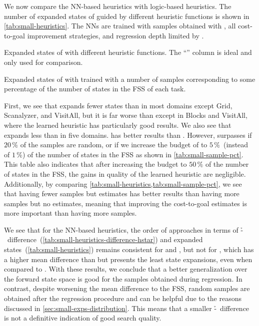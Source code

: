 We now compare the NN-based heuristics with logic-based heuristics. The number of expanded states of \gbfs guided by different heuristic functions is shown in \cref{tab:small-heuristics}. The NNs are trained with samples obtained with \bfsrw, all cost-to-goal improvement strategies, and regression depth limited by \rlmeanfx.  

\begin{table}[tb]
    \caption[Expanded states of different heuristic functions.]{Expanded states of \gbfs with different heuristic functions. The ``\hstar'' column is ideal and only used for comparison.}
    \addmargin
    \label{tab:small-heuristics}
    \centering
    
\end{table}

\begin{table}[tb]
    \caption[Expanded states from different sample set sizes.]{Expanded states of \gbfs with \hnnl{\rlmeanfx} trained with a number of samples corresponding to some percentage of the number of states in the FSS of each task.}
    \label{tab:small-sample-pct}
    \addmargin
    \centering
    
\end{table}

First, we see that \hnnbase expands fewer states than \hgc in most domains except Grid, Scanalyzer, and VisitAll, but it is far worse than \hff except in Blocks and VisitAll, where the learned heuristic has particularly good results. We also see that \hnnl{\rlmeanfx} expands less than \hnnbase in five domains. \hff has better results than \hnnl{\rlmeanfx}. However, \hnnl{\rlmeanfx} surpasses \hff if $20\,\%$ of the samples are random, or if we increase the budget of \hnnl{\rlmeanfx} to $5\,\%$~(instead of $1\,\%$) of the number of states in the FSS as shown in \cref{tab:small-sample-pct}. This table also indicates that after increasing the budget to $50\,\%$ of the number of states in the FSS, the gains in quality of the learned heuristic are negligible. Additionally, by comparing \cref{tab:small-heuristics,tab:small-sample-pct}, we see that having fewer samples but \hstar estimates has better results than having more samples but no \hstar estimates, meaning that improving the cost-to-goal estimates is more important than having more samples.

We see that for the NN-based heuristics, the order of approaches in terms of \mbox{\h-\hstar}~difference~(\cref{tab:small-heuristics-difference-hstar}) and expanded states~(\cref{tab:small-heuristics}) remains consistent for \hnnbase and \hnnl{\rlmeanfx}, but not for \hnnrs, which has a higher mean difference than \hnnl{\rlmeanfx} but presents the least state expansions, even when compared to \hff. With these results, we conclude that a better generalization over the forward state space is good for the samples obtained during regression. In contrast, despite worsening the mean difference to the FSS, random samples are obtained after the regression procedure and can be helpful due to the reasons discussed in \cref{sec:small-exps-distribution}. This means that a smaller \mbox{\h-\hstar}~difference is not a definitive indication of good search quality.

